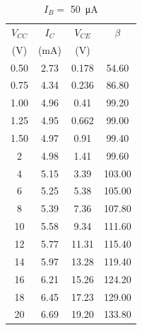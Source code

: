 \begin{table}[hbtp]
  \centering
  \begin{tabular}{cccc}
    $V_{CC}$ & $I_C$     & $V_{CE}$ & $\beta$ \\
    (\si{V}) & (\si{mA}) & (\si{V}) &         \\
    \hline
    0.50     & 2.73      & 0.178    & 54.60   \\
    0.75     & 4.34      & 0.236    & 86.80   \\
    1.00     & 4.96      & 0.41     & 99.20   \\
    1.25     & 4.95      & 0.662    & 99.00   \\
    1.50     & 4.97      & 0.91     & 99.40   \\
    2        & 4.98      & 1.41     & 99.60   \\
    4        & 5.15      & 3.39     & 103.00  \\
    6        & 5.25      & 5.38     & 105.00  \\
    8        & 5.39      & 7.36     & 107.80  \\
    10       & 5.58      & 9.34     & 111.60  \\
    12       & 5.77      & 11.31    & 115.40  \\
    14       & 5.97      & 13.28    & 119.40  \\
    16       & 6.21      & 15.26    & 124.20  \\
    18       & 6.45      & 17.23    & 129.00  \\
    20       & 6.69      & 19.20    & 133.80  \\
  \end{tabular}
  \caption{\label{tab2:}$I_B = $ \SI{50}{\micro\ampere}}
\end{table}

